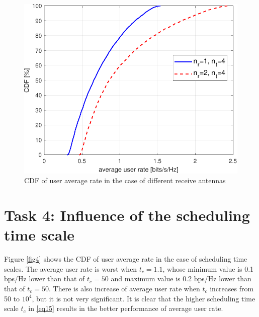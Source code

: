 \documentclass[10pt,conference]{IEEEtran}
\begin{document}
\begin{figure} [htb]
    \centering
    \includegraphics[width=1\linewidth]{Fig3.pdf}
    \caption{CDF of user average rate in the case of different receive antennas}
    \label{fig3}
\end{figure}

\section{Task 4: Influence of the scheduling time scale}

Figure \ref{fig4} shows the CDF of user average rate in the case of 
scheduling time scales. The average user rate is worst when $t_c=1.1$, whose 
minimum value is 0.1 bps/Hz lower than that of $t_c=50$ and maximum value is 0.2 
bps/Hz lower than that of $t_c=50$. There is also increase of average user rate when 
$t_c$ increases from 50 to $10^4$, but it is not very significant.
It is clear that the higher scheduling time scale 
$t_c$ in \eqref{eq15} results in the better performance of average user rate.
\end{document}
